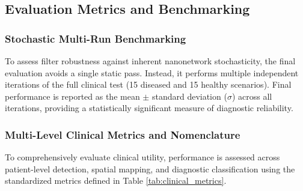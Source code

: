 \documentclass[sigconf]{acmart}
\begin{document}
\subsection{Evaluation Metrics and Benchmarking}

\subsubsection{Stochastic Multi-Run Benchmarking}
To assess filter robustness against inherent nanonetwork stochasticity, the final evaluation avoids a single static pass. Instead, it performs multiple independent iterations of the full clinical test (15 diseased and 15 healthy scenarios). Final performance is reported as the mean $\pm$ standard deviation ($\sigma$) across all iterations, providing a statistically significant measure of diagnostic reliability.

\subsubsection{Multi-Level Clinical Metrics and Nomenclature}
To comprehensively evaluate clinical utility, performance is assessed across patient-level detection, spatial mapping, and diagnostic classification using the standardized metrics defined in Table \ref{tab:clinical_metrics}.
\end{document}
